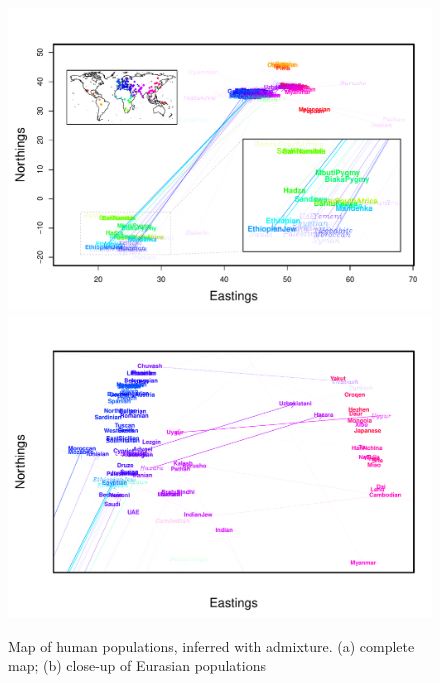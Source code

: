 \documentclass[12pt]{article}
\begin{document}
\begin{figure}
	\centering
			{\includegraphics[width=\textwidth,height=0.71\textwidth]{figs/globetrotter/globe_Ad_map_AfricaInset.pdf}}
			{\includegraphics[width=\textwidth,height=0.71\textwidth]{figs/globetrotter/eurasia_Ad_map_indproc.pdf}}
	\caption{Map of human populations, inferred with admixture. (a) complete map; (b) close-up of Eurasian populations}\label{sfig:globe_ad_maps}
\end{figure}
\end{document}
